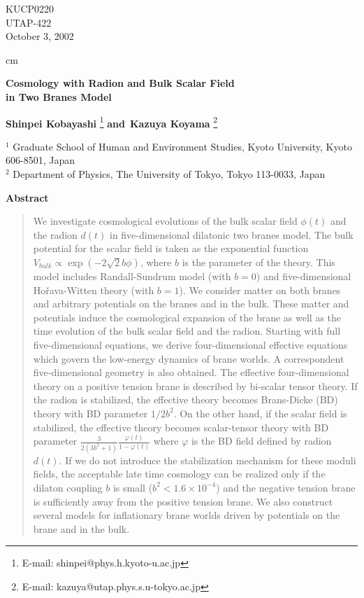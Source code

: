 \documentclass[a4paper,11pt]{article}
\begin{document}
\baselineskip 0.8cm
\thispagestyle{empty}
\begin{flushright}
KUCP0220\\
UTAP-422\\
October 3, 2002\\ 
\end{flushright}
 cm
\begin{center}
{\LARGE \bf Cosmology with Radion and Bulk Scalar Field} \\
{\LARGE \bf in Two Branes Model}
\vskip 1.7cm

{\bf Shinpei Kobayashi}
\footnote{E-mail: shinpei@phys.h.kyoto-u.ac.jp}
{\bf and}\ 
{\bf Kazuya Koyama}
\footnote{E-mail: kazuya@utap.phys.s.u-tokyo.ac.jp}\

\vskip 1.5mm

\vskip 2cm
 $^1$ Graduate School of Human and Environment Studies, Kyoto
University, Kyoto  606-8501, Japan \\
 $^2$ Department of Physics, The University of Tokyo, Tokyo 113-0033, 
     Japan 
\end{center}

\newpage

\vskip 1cm
{\centerline{\large\bf Abstract}}
\begin{quotation}
\vskip -0.4cm
%
We investigate cosmological evolutions of the 
bulk scalar field $\phi(t)$ and the radion $d(t)$ in five-dimensional 
dilatonic two branes model. The bulk potential for the scalar field is 
taken as the exponential function $V_{bulk} \propto \exp(-2 \sqrt{2} b\phi)$,
where $b$ is the parameter of the theory. 
This model includes Randall-Sundrum model (with $b=0$) and five-dimensional 
Ho\v{r}ava-Witten theory (with $b=1$). We consider matter on both 
branes and arbitrary potentials on the branes and in the bulk. These matter and 
potentials induce the cosmological expansion of the brane as well as the 
time evolution of the bulk scalar field and the radion. Starting with full 
five-dimensional equations, we derive four-dimensional 
effective equations which govern the low-energy dynamics of brane worlds. 
A correspondent five-dimensional geometry is also obtained. The effective 
four-dimensional theory on a positive tension brane is described by bi-scalar 
tensor theory.  If the radion is stabilized, the effective theory becomes 
Brans-Dicke (BD) theory with BD parameter $1/2 b^2$. On the other hand, 
if the scalar field is stabilized, the effective theory becomes scalar-tensor theory 
with BD parameter $\frac{3}{2(3b^2+1)}\frac{\varphi(t)}{1-\varphi(t)}$ where $\varphi$ is 
the BD field defined by radion $d(t)$. If we do not introduce the stabilization
mechanism for these moduli fields, the acceptable late
time cosmology can be realized only if the dilaton coupling $b$ is small
($b^2 < 1.6 \times 10^{-4}$) and the negative tension brane is sufficiently
away from the positive tension brane. We also construct several models for
inflationary brane worlds driven by potentials on the brane and in the bulk. 

\end{quotation}
\end{document}
